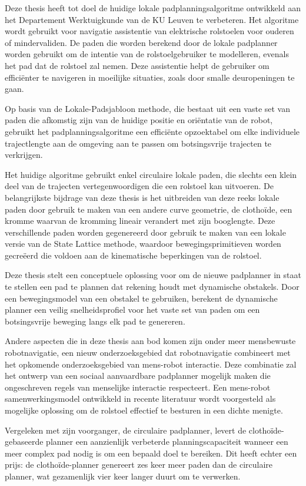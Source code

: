 \documentclass[oneside,english,master=wtk,inputenc="utf8"]{kulemt}
\begin{document}
\begin{abstract*}
\vspace{-1.03em}
Deze thesis heeft tot doel de huidige lokale padplanningsalgoritme ontwikkeld aan het Departement Werktuigkunde van de KU Leuven te verbeteren. Het algoritme wordt gebruikt voor navigatie assistentie van elektrische rolstoelen voor ouderen of mindervaliden. De paden die worden berekend door de lokale padplanner worden gebruikt om de intentie van de rolstoelgebruiker te modelleren, evenals het pad dat de rolstoel zal nemen. Deze assistentie helpt de gebruiker om efficiënter te navigeren in moeilijke situaties, zoals door smalle deuropeningen te gaan.

Op basis van de Lokale-Padsjabloon methode, die bestaat uit een vaste set van paden die afkomstig zijn van de huidige positie en oriëntatie van de robot, gebruikt het padplanningsalgoritme een efficiënte opzoektabel om elke individuele trajectlengte aan de omgeving aan te passen om botsingsvrije trajecten te verkrijgen.

Het huidige algoritme gebruikt enkel circulaire lokale paden, die slechts een klein deel van de trajecten vertegenwoordigen die een rolstoel kan uitvoeren. De belangrijkste bijdrage van deze thesis is het uitbreiden van deze reeks lokale paden door gebruik te maken van een andere curve geometrie, de clothoïde, een kromme waarvan de kromming lineair verandert met zijn booglengte. Deze verschillende paden worden gegenereerd door gebruik te maken van een lokale versie van de State Lattice methode, waardoor bewegingsprimitieven worden gecreëerd die voldoen aan de kinematische beperkingen van de rolstoel.

Deze thesis stelt een conceptuele oplossing voor om de nieuwe padplanner in staat te stellen een pad te plannen dat rekening houdt met dynamische obstakels. Door een bewegingsmodel van een obstakel te gebruiken, berekent de dynamische planner een veilig snelheidsprofiel voor het vaste set van paden om een botsingsvrije beweging langs elk pad te genereren.

Andere aspecten die in deze thesis aan bod komen zijn onder meer mensbewuste robotnavigatie, een nieuw onderzoeksgebied dat robotnavigatie combineert met het opkomende onderzoeksgebied van mens-robot interactie. Deze combinatie zal het ontwerp van een sociaal aanvaardbare padplanner mogelijk maken die ongeschreven regels van menselijke interactie respecteert. Een mens-robot samenwerkingsmodel ontwikkeld in recente literatuur wordt voorgesteld als mogelijke oplossing om de rolstoel effectief te besturen in een dichte menigte.

Vergeleken met zijn voorganger, de circulaire padplanner, levert de clothoïde-gebaseerde planner een aanzienlijk verbeterde planningscapaciteit wanneer een meer complex pad nodig is om een bepaald doel te bereiken. Dit heeft echter een prijs: de clothoïde-planner genereert zes keer meer paden dan de circulaire planner, wat gezamenlijk vier keer langer duurt om te verwerken.
\end{abstract*}
\end{document}
